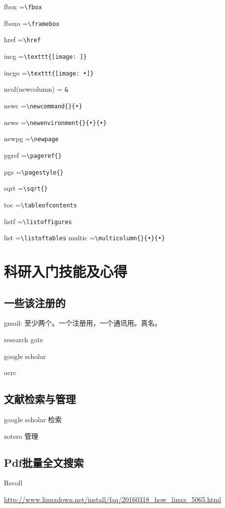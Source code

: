fbox   =\verb|\fbox|

fboxo  =\verb|\framebox|

href   =\verb|\href|

incg   =\verb|\texttt{[image: ]}|

incgo  =\verb|\texttt{[image: •]}|

ncol(newcolumn) = \verb|&|

newc  =\verb|\newcommand{}{•}|

newe  =\verb|\newenvironment{}{•}{•}|

newpg =\verb|\newpage|

pgref  =\verb|\pageref{}|

pgs   =\verb|\pagestyle{}|

sqrt   =\verb|\sqrt{}|

toc   =\verb|\tableofcontents|

listf   =\verb|\listoffigures|

list   =\verb|\listoftables|
multic =\verb|\multicolumn{}{•}{•}|







\chapter{科研入门技能及心得}
\section{一些该注册的}
gmail: 至少两个。一个注册用，一个通讯用。真名。

research gate

google scholar

ocrc

\section{文献检索与管理}
google scholar 检索

zotero 管理

\section{Pdf批量全文搜索}
Recoll

\url{http://www.linuxdown.net/install/faq/20160318_how_linux_5065.html}




